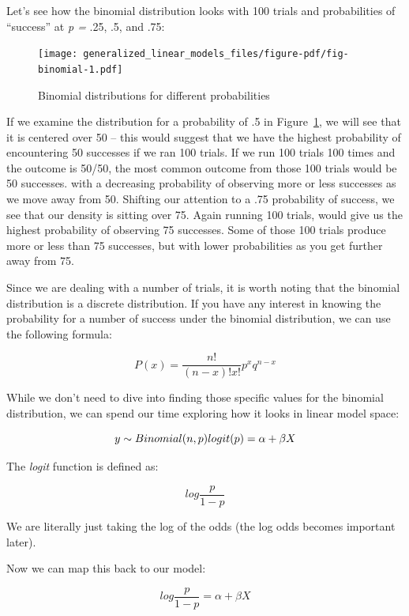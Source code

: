 \documentclass[
  letterpaper,
]{krantz}
\begin{document}
Let's see how the binomial distribution looks with 100 trials and
probabilities of ``success'' at \emph{p = } .25, .5, and .75:

\begin{figure}

{\centering \texttt{[image: generalized\_linear\_models\_files/figure-pdf/fig-binomial-1.pdf]}

}

\caption{\label{fig-binomial}Binomial distributions for different
probabilities}

\end{figure}

If we examine the distribution for a probability of .5 in
Figure~\ref{fig-binomial}, we will see that it is centered over 50 --
this would suggest that we have the highest probability of encountering
50 successes if we ran 100 trials. If we run 100 trials 100 times and
the outcome is 50/50, the most common outcome from those 100 trials
would be 50 successes. with a decreasing probability of observing more
or less successes as we move away from 50. Shifting our attention to a
.75 probability of success, we see that our density is sitting over 75.
Again running 100 trials, would give us the highest probability of
observing 75 successes. Some of those 100 trials produce more or less
than 75 successes, but with lower probabilities as you get further away
from 75.

Since we are dealing with a number of trials, it is worth noting that
the binomial distribution is a discrete distribution. If you have any
interest in knowing the probability for a number of success under the
binomial distribution, we can use the following formula:

\[P(x) = \frac{n!}{(n-x)!x!}p^xq^{n-x}\]

While we don't need to dive into finding those specific values for the
binomial distribution, we can spend our time exploring how it looks in
linear model space:

\[y \sim Binomial(n, p) \\ logit(p) = \alpha + \beta X\]

The \emph{logit} function is defined as:

\[log\frac{p}{1-p}\]

We are literally just taking the log of the odds (the log odds becomes
important later).

Now we can map this back to our model:

\[log\frac{p}{1-p} = \alpha + \beta X\]
\end{document}
